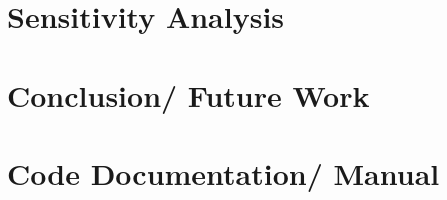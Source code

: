 \documentclass[a4paper, oneside]{discothesis}
\begin{document}
\chapter{Sensitivity Analysis}
\chapter{Conclusion/ Future Work}





\appendix
\chapter{Code Documentation/ Manual} 
\end{document}
